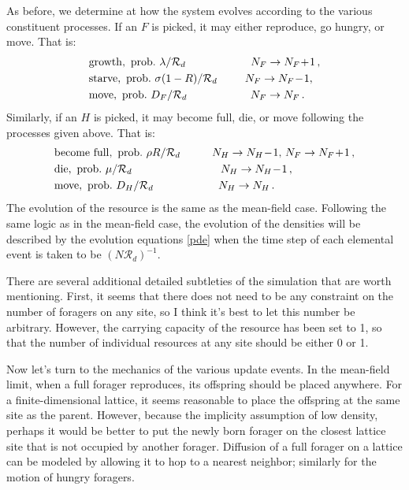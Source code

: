 \documentclass[11pt]{iopart}
\begin{document}
As before, we determine at how the system evolves according to the various
constituent processes.  If an $F$ is picked, it may either reproduce, go
hungry, or move.  That is:
\begin{align*}
&\mathrm{growth,~ prob.\ } \lambda/\mathcal{R}_d\hskip 0.82 in N_F\to N_F\!+\!1\,,\\
&\mathrm{starve,~ prob.\ } \sigma(1-R)/\mathcal{R}_d \hskip 0.35 in N_F\to N_F\!-\!1,\,\\
&\mathrm{move,~ prob.\ } D_F/\mathcal{R}_d \hskip 0.8 in N_F\to N_F\,.
\end{align*}
Similarly, if an $H$ is picked, it may become full, die, or move following
the processes given above.  That is:
\begin{align*}
&\mathrm{become\ full,~  prob.\ } \rho R/\mathcal{R}_d\hskip 0.4in N_H\to N_H\!-\!1,\,
  N_F\to N_F\!+\!1\,,\\
&\mathrm{die,~ prob.\ } \mu/\mathcal{R}_d\hskip 1.12 in N_H\to N_H\!-\!1\,,\\
&\mathrm{move,~ prob.\ } D_H/\mathcal{R}_d\hskip 0.82 in N_H\to N_H\,.
\end{align*}
The evolution of the resource is the same as the mean-field case.  Following
the same logic as in the mean-field case, the evolution of the densities will
be described by the evolution equations \eqref{pde} when the time step of
each elemental event is taken to be $(N\mathcal{R}_d)^{-1}$.

There are several additional detailed subtleties of the simulation that are
worth mentioning.  First, it seems that there does not need to be any
constraint on the number of foragers on any site, so I think it's best to let
this number be arbitrary.  However, the carrying capacity of the resource has
been set to 1, so that the number of individual resources at any site should
be either 0 or 1.

Now let's turn to the mechanics of the various update events.  In the
mean-field limit, when a full forager reproduces, its offspring should be
placed anywhere.  For a finite-dimensional lattice, it seems reasonable to
place the offspring at the same site as the parent.  However, because the
implicity assumption of low density, perhaps it would be better to put the
newly born forager on the closest lattice site that is not occupied by
another forager.  Diffusion of a full forager on a lattice can be modeled by
allowing it to hop to a nearest neighbor; similarly for the motion of hungry
foragers.
\end{document}

